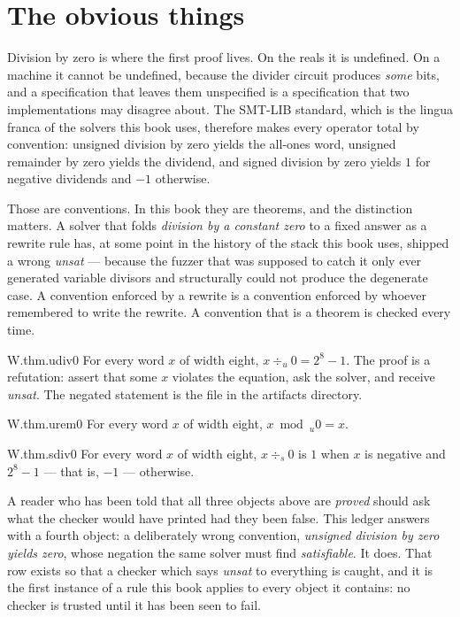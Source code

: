 \section{The obvious things}
\label{sec:totality}

Division by zero is where the first proof lives. On the reals it is undefined. On a machine it cannot be undefined, because the divider circuit produces \emph{some} bits, and a specification that leaves them unspecified is a specification that two implementations may disagree about. The SMT-LIB standard, which is the lingua franca of the solvers this book uses, therefore makes every operator total by convention: unsigned division by zero yields the all-ones word, unsigned remainder by zero yields the dividend, and signed division by zero yields \(1\) for negative dividends and \(-1\) otherwise.

Those are conventions. In this book they are theorems, and the distinction matters. A solver that folds \emph{division by a constant zero} to a fixed answer as a rewrite rule has, at some point in the history of the stack this book uses, shipped a wrong \emph{unsat} --- because the fuzzer that was supposed to catch it only ever generated variable divisors and structurally could not produce the degenerate case. A convention enforced by a rewrite is a convention enforced by whoever remembered to write the rewrite. A convention that is a theorem is checked every time.

\begin{artifact}{W.thm.udiv0}
For every word \(x\) of width eight, \(x \div_u 0 = 2^8 - 1\). The proof is a refutation: assert that some \(x\) violates the equation, ask the solver, and receive \emph{unsat}. The negated statement is the file  in the artifacts directory.
\end{artifact}

\begin{artifact}{W.thm.urem0}
For every word \(x\) of width eight, \(x \bmod_u 0 = x\).
\end{artifact}

\begin{artifact}{W.thm.sdiv0}
For every word \(x\) of width eight, \(x \div_s 0\) is \(1\) when \(x\) is negative and \(2^8 - 1\) --- that is, \(-1\) --- otherwise.
\end{artifact}

\begin{keyidea}[title={A checker that cannot fail}]
A reader who has been told that all three objects above are \emph{proved} should ask what the checker would have printed had they been false. This ledger answers with a fourth object: a deliberately wrong convention, \emph{unsigned division by zero yields zero}, whose negation the same solver must find \emph{satisfiable}. It does. That row exists so that a checker which says \emph{unsat} to everything is caught, and it is the first instance of a rule this book applies to every object it contains: no checker is trusted until it has been seen to fail.
\end{keyidea}

